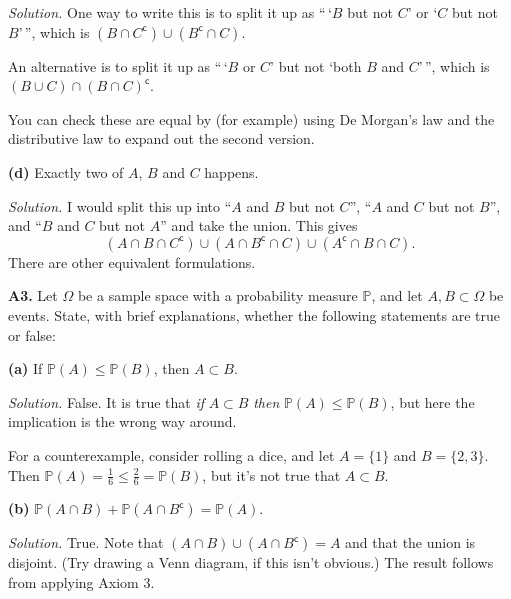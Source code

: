\documentclass[
  a4paper,
]{book}
\theoremstyle{definition}
\theoremstyle{definition}
\theoremstyle{definition}
\theoremstyle{definition}
\theoremstyle{remark}
\begin{document}
\begin{myanswers}
\emph{Solution.} One way to write this is to split it up as ``\,`\(B\) but not \(C\)' or `\(C\) but not \(B\)'\,'', which is \((B \cap C^{\mathsf{c}}) \cup (B^{\mathsf{c}} \cap C)\).

An alternative is to split it up as ``\,`\(B\) or \(C\)' but not `both \(B\) and \(C\)'\,'', which is \((B \cup C) \cap (B\cap C)^{\mathsf{c}}\).

You can check these are equal by (for example) using De Morgan's law and the distributive law to expand out the second version.

\end{myanswers}

\textbf{(d)} Exactly two of \(A\), \(B\) and \(C\) happens.

\begin{myanswers}
\emph{Solution.} I would split this up into ``\(A\) and \(B\) but not \(C\)'', ``\(A\) and \(C\) but not \(B\)'', and ``\(B\) and \(C\) but not \(A\)'' and take the union. This gives
\[  (A \cap B \cap C^{\mathsf{c}}) \cup (A \cap B^{\mathsf{c}} \cap C) \cup (A^{\mathsf{c}} \cap B \cap C) . \]
There are other equivalent formulations.

\end{myanswers}

\textbf{A3.} Let \(\Omega\) be a sample space with a probability measure \(\mathbb P\), and let \(A, B \subset \Omega\) be events. State, with brief explanations, whether the following statements are true or false:

\textbf{(a)} If \(\mathbb P(A) \leq \mathbb P(B)\), then \(A \subset B\).

\begin{myanswers}
\emph{Solution.} False. It is true that \emph{if} \(A \subset B\) \emph{then} \(\mathbb P(A) \leq \mathbb P(B)\), but here the implication is the wrong way around.

For a counterexample, consider rolling a dice, and let \(A = \{1\}\) and \(B = \{2,3\}\). Then \(\mathbb P(A) = \frac16 \leq \frac26 = \mathbb P(B)\), but it's not true that \(A \subset B\).

\end{myanswers}

\textbf{(b)} \(\mathbb P(A \cap B) + \mathbb P(A \cap B^{\mathsf{c}}) = \mathbb P(A)\).

\begin{myanswers}
\emph{Solution.} True. Note that \((A \cap B) \cup (A \cap B^{\mathsf{c}}) = A\) and that the union is disjoint. (Try drawing a Venn diagram, if this isn't obvious.) The result follows from applying Axiom 3.

\end{myanswers}
\end{document}

